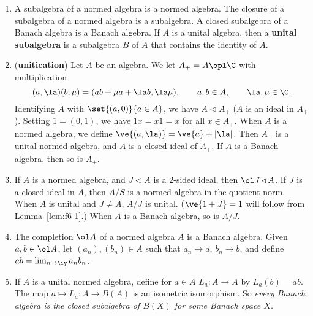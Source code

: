 \begin{enumerate}
\item
A subalgebra of a normed algebra is a normed algebra. The closure of a subalgebra of a normed algebra is a subalgebra. A closed subalgebra of a Banach algebra is a Banach algebra.
If $A$ is a unital algebra, then a \textbf{unital subalgebra} is a subalgebra $B$ of $A$ that contains the identity of $A$.
\item (\textbf{unitication}) Let $A$ be an algebra. We let $A_+=A\opl \C$ with multiplication
\[
(a,\la)(b,\mu)=(ab+\mu a+\la b,\la\mu),\qquad a,b\in A, \qquad \la,\mu\in \C.
\]
Identifying $A$ with $\set{(a,0)}{a\in A}$, we have $A\triangleleft A_+$ ($A$ is an ideal in $A_+$). Setting $1=(0,1)$, we have $1x=x1=x$ for all $x\in A_+$. When $A$ is a normed algebra, we define $\ve{(a,\la)}=\ve{a}+|\la|$. Then $A_+$ is a unital normed algebra, and $A$ is a closed ideal of $A_+$. If $A$ is a Banach algebra, then so is $A_+$.
\item
If $A$ is a normed algebra, and $J\triangleleft A$ is a 2-sided ideal, then $\ol J\triangleleft A$. If $J$ is a closed ideal in $A$, then $A/S$ is a normed algebra in the quotient norm. When $A$ is unital and $J\ne A$, $A/J$ is unital. ($\ve{1+J}=1$ will follow from Lemma~\ref{lem:f6-1}.) When $A$ is a Banach algebra, so is $A/J$.
\item
The completion $\ol A$ of a normed algebra $A$ is a Banach algebra. Given $a,b\in \ol A$, let $(a_n),(b_n)\in A$ such that $a_n\to a$, $b_n\to b$, and define $ab=\lim_{n\to \iy}a_nb_n$.
\item
If $A$ is a unital normed algebra, define for $a\in A$ $L_a:A\to A$ by $L_a(b)=ab$. The map $a\mapsto L_a:A\to B(A)$ is an isometric isomorphism. So {\it every Banach algebra is the closed subalgebra of $B(X)$ for some Banach space $X$.}
\end{enumerate}

